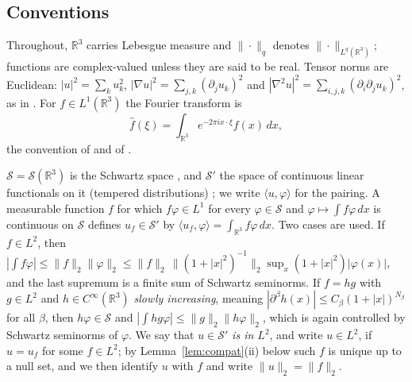 \documentclass[11pt]{article}
\theoremstyle{definition}
\theoremstyle{plain}
\newcommand{\R}{\mathbb R}
\begin{document}
\subsection*{Conventions}

Throughout, $\R^3$ carries Lebesgue measure and $\|\cdot\|_q$ denotes
$\|\cdot\|_{L^q(\R^3)}$; functions are complex-valued unless they are said
to be real.  Tensor norms are Euclidean: $|u|^2=\sum_ku_k^2$,
$|\nabla u|^2=\sum_{j,k}(\partial_ju_k)^2$ and
$|\nabla^2u|^2=\sum_{i,j,k}(\partial_i\partial_ju_k)^2$, as in
\cite[p.~35]{Tao2013}.  For $f\in L^1(\R^3)$ the Fourier transform is
\[
 \hat f(\xi)=\int_{\R^3}e^{-2\pi ix\cdot\xi}f(x)\,dx ,
\]
the convention of \cite[p.~35]{Tao2013} and of
\cite[Definition~2.2.8, p.~108]{Grafakos2014}.

$\mathcal S=\mathcal S(\R^3)$ is the Schwartz space
\cite[Definition~2.2.1, p.~105]{Grafakos2014}, and $\mathcal S'$ the space
of continuous linear functionals on it (tempered distributions)
\cite[Definition~2.3.3, p.~121]{Grafakos2014}; we write
$\langle u,\varphi\rangle$ for the pairing.  A measurable function $f$ for
which $f\varphi\in L^1$ for every $\varphi\in\mathcal S$ and
$\varphi\mapsto\int f\varphi\,dx$ is continuous on $\mathcal S$ defines
$u_f\in\mathcal S'$ by $\langle u_f,\varphi\rangle=\int_{\R^3}f\varphi\,dx$.
Two cases are used.  If $f\in L^2$, then
$|\int f\varphi|\le\|f\|_2\|\varphi\|_2\le
\|f\|_2\,\|(1+|x|^2)^{-1}\|_2\sup_x(1+|x|^2)|\varphi(x)|$, and the last
supremum is a finite sum of Schwartz seminorms.  If $f=hg$ with $g\in L^2$
and $h\in C^\infty(\R^3)$ \emph{slowly increasing}, meaning
$|\partial^\beta h(x)|\le C_\beta(1+|x|)^{N_\beta}$ for all $\beta$, then
$h\varphi\in\mathcal S$ and $|\int hg\varphi|\le\|g\|_2\|h\varphi\|_2$,
which is again controlled by Schwartz seminorms of $\varphi$.  We say that
$u\in\mathcal S'$ \emph{is in $L^2$}, and write $u\in L^2$, if $u=u_f$ for
some $f\in L^2$; by Lemma~\ref{lem:compat}(ii) below such $f$ is unique up
to a null set, and we then identify $u$ with $f$ and write $\|u\|_2=\|f\|_2$.
\end{document}
